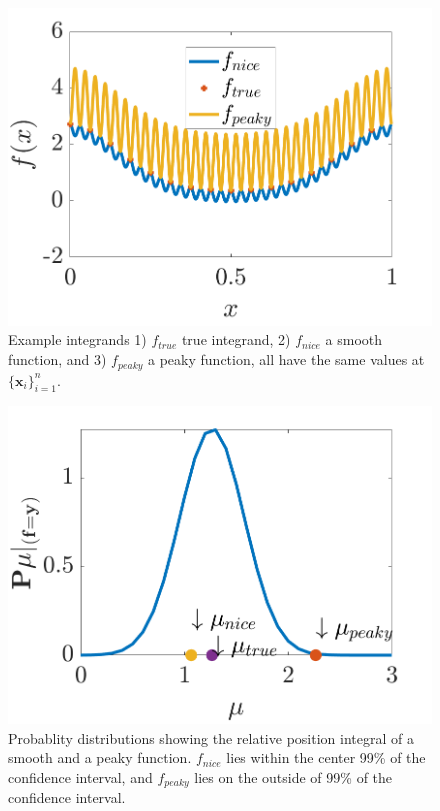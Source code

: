 \documentclass{iitthesis}          %
\newcommand{\bm}[1]{\boldsymbol{#1}}
\newcommand{\vx}{\bm{x}}
\begin{document}
\begin{figure}
	\centering
	\includegraphics[width=0.8\linewidth]{cone_bayes_f_real}
	\caption{Example integrands 1) $f_{true}$ true integrand, 2) $f_{nice}$ a smooth function, and 3) $f_{peaky}$ a peaky function, all have the same values at $\{\vx_i\}_{i=1}^n$.}
	\label{fig:cone_bayes_functions}
\end{figure}
\begin{figure}
	\centering
	\includegraphics[width=0.8\linewidth]{cone_bayes_mu_pdf}
	\caption{Probablity distributions showing the relative position integral of a smooth and a peaky function. $f_{nice}$ lies within the center 99\% of the confidence interval, and $f_{peaky}$ lies on the outside of 99\% of  the confidence interval.}
	\label{fig:cone_bayes_posterior}
\end{figure}
\end{document}
